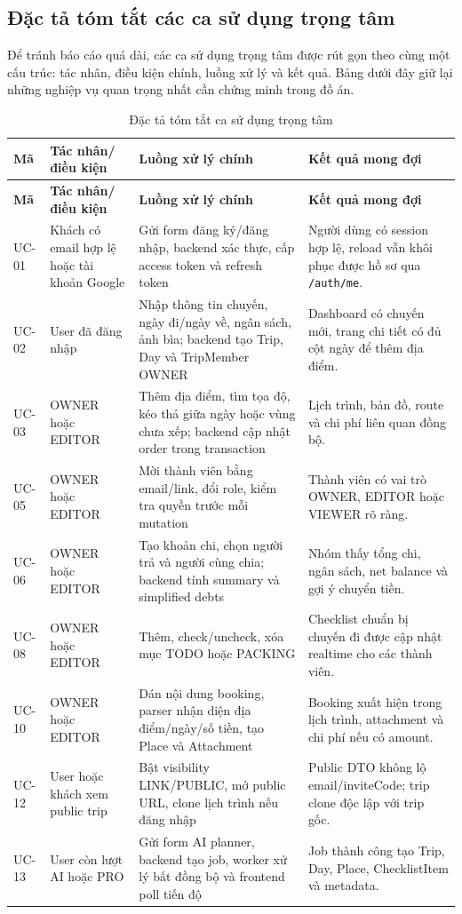\documentclass[a4paper]{report}
\begin{document}
\subsection{Đặc tả tóm tắt các ca sử dụng trọng tâm}

Để tránh báo cáo quá dài, các ca sử dụng trọng tâm được rút gọn theo cùng một cấu trúc: tác nhân, điều kiện chính, luồng xử lý và kết quả. Bảng dưới đây giữ lại những nghiệp vụ quan trọng nhất cần chứng minh trong đồ án.

\begin{longtable}{|C{1.6cm}|P{4.3cm}|P{5.2cm}|P{4.4cm}|}
\caption{Đặc tả tóm tắt ca sử dụng trọng tâm}\\
\hline
\textbf{Mã} & \textbf{Tác nhân/điều kiện} & \textbf{Luồng xử lý chính} & \textbf{Kết quả mong đợi}\\
\hline
\endfirsthead
\hline
\textbf{Mã} & \textbf{Tác nhân/điều kiện} & \textbf{Luồng xử lý chính} & \textbf{Kết quả mong đợi}\\
\hline
\endhead
UC-01 & Khách có email hợp lệ hoặc tài khoản Google & Gửi form đăng ký/đăng nhập, backend xác thực, cấp access token và refresh token & Người dùng có session hợp lệ, reload vẫn khôi phục được hồ sơ qua \texttt{/auth/me}.\\
\hline
UC-02 & User đã đăng nhập & Nhập thông tin chuyến, ngày đi/ngày về, ngân sách, ảnh bìa; backend tạo Trip, Day và TripMember OWNER & Dashboard có chuyến mới, trang chi tiết có đủ cột ngày để thêm địa điểm.\\
\hline
UC-03 & OWNER hoặc EDITOR & Thêm địa điểm, tìm tọa độ, kéo thả giữa ngày hoặc vùng chưa xếp; backend cập nhật order trong transaction & Lịch trình, bản đồ, route và chi phí liên quan đồng bộ.\\
\hline
UC-05 & OWNER hoặc EDITOR & Mời thành viên bằng email/link, đổi role, kiểm tra quyền trước mỗi mutation & Thành viên có vai trò OWNER, EDITOR hoặc VIEWER rõ ràng.\\
\hline
UC-06 & OWNER hoặc EDITOR & Tạo khoản chi, chọn người trả và người cùng chia; backend tính summary và simplified debts & Nhóm thấy tổng chi, ngân sách, net balance và gợi ý chuyển tiền.\\
\hline
UC-08 & OWNER hoặc EDITOR & Thêm, check/uncheck, xóa mục TODO hoặc PACKING & Checklist chuẩn bị chuyến đi được cập nhật realtime cho các thành viên.\\
\hline
UC-10 & OWNER hoặc EDITOR & Dán nội dung booking, parser nhận diện địa điểm/ngày/số tiền, tạo Place và Attachment & Booking xuất hiện trong lịch trình, attachment và chi phí nếu có amount.\\
\hline
UC-12 & User hoặc khách xem public trip & Bật visibility LINK/PUBLIC, mở public URL, clone lịch trình nếu đăng nhập & Public DTO không lộ email/inviteCode; trip clone độc lập với trip gốc.\\
\hline
UC-13 & User còn lượt AI hoặc PRO & Gửi form AI planner, backend tạo job, worker xử lý bất đồng bộ và frontend poll tiến độ & Job thành công tạo Trip, Day, Place, ChecklistItem và metadata.\\
\hline
\end{longtable}
\end{document}

